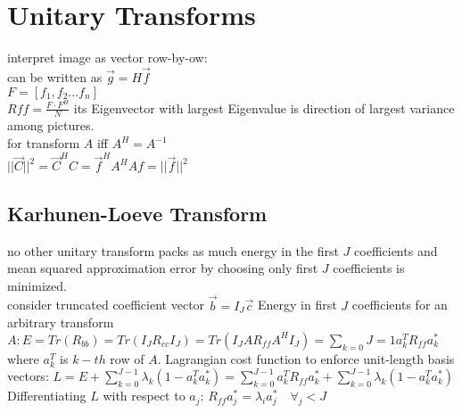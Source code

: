 \section{Unitary Transforms}
 interpret image as vector row-by-ow: \\
 can be written as $\vec{g} = H\vec{f}$\\
 $F = [f_1, f_2... f_n]$\\
 $Rff = \frac{F \cdot F^H}{N}$ its Eigenvector with largest Eigenvalue is direction of largest variance among pictures.\\
 for transform $A$ iff $A^H = A^{-1}$ \\
 $||\vec{C}||^{2} = \vec{C}^{H}C = \vec{f}^{H}A^{H}Af = ||\vec{f}||^{2}$ \\
\subsection*{Karhunen-Loeve Transform }
 no other unitary transform packs as much energy in the first $J$ coefficients  and mean squared approximation error by choosing only first $J$ coefficients is minimized.\\
 consider truncated coefficient vector $\vec{b} = I_J \vec{c}$  Energy in first $J$ coefficients for an arbitrary transform $A : E = Tr(R_{bb}) = Tr(I_J R_{cc} I_{J}) = Tr(I_J A R_{ff} A^H I_J) = \sum_{k = 0}{J = 1} a_k^T R_{ff} a_k^*$ where $a_k^T$ is $k-th$ row of $A$. Lagrangian cost function to enforce unit-length basis vectors: 
$L = E + \sum_{k = 0}^{J - 1} \lambda_k (1 - a_k^T a_k^*) = \sum_{k = 0}^{J - 1} a_k^T R_{ff} a_k^* + \sum_{k = 0}^{J - 1} \lambda_k (1 - a_k^T a_k^*)$\\ 
Differentiating $L$ with respect to $a_j$: $R_{ff} a_j^* = \lambda_i a_j^* \quad \forall_j < J$ 
